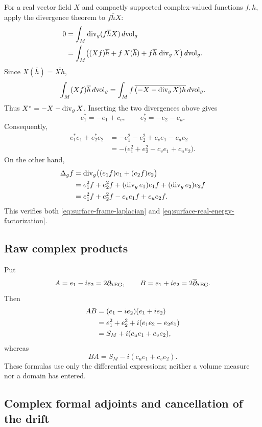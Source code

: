 For a real vector field $X$ and compactly supported complex-valued functions
$f,h$, apply the divergence theorem to $f\overline h X$:
\begin{align*}
 0
 &=\int_M\operatorname{div}_g(f\overline h X)\,d\mathrm{vol}_g\\
 &=\int_M
   \bigl((Xf)\overline h+f\,X(\overline h)
         +f\overline h\,\operatorname{div}_gX\bigr)\,d\mathrm{vol}_g.
\end{align*}
Since $X(\overline h)=\overline{Xh}$,
\begin{equation}\label{eq:appendix-vector-field-adjoint}
 \int_M(Xf)\overline h\,d\mathrm{vol}_g
 =\int_M f\,
  \overline{(-X-\operatorname{div}_gX)h}\,d\mathrm{vol}_g.
\end{equation}
Thus $X^*=-X-\operatorname{div}_gX$.  Inserting the two divergences above gives
\[
 e_1^*=-e_1+c_v,
 \qquad
 e_2^*=-e_2-c_u.
\]
Consequently,
\begin{align*}
 e_1^*e_1+e_2^*e_2
 &=-e_1^2-e_2^2+c_ve_1-c_ue_2\\
 &=-\bigl(e_1^2+e_2^2-c_ve_1+c_ue_2\bigr).
\end{align*}
On the other hand,
\begin{align*}
 \Delta_gf
 &=\operatorname{div}_g\bigl((e_1f)e_1+(e_2f)e_2\bigr)\\
 &=e_1^2f+e_2^2f
   +(\operatorname{div}_ge_1)e_1f+(\operatorname{div}_ge_2)e_2f\\
 &=e_1^2f+e_2^2f-c_ve_1f+c_ue_2f.
\end{align*}
This verifies both
\eqref{eq:surface-frame-laplacian} and
\eqref{eq:surface-real-energy-factorization}.

\subsection{Raw complex products}

Put
\[
 A=e_1-ie_2=2\partial_{\!\mathrm{AEG}},
 \qquad
 B=e_1+ie_2=2\overline\partial_{\!\mathrm{AEG}}.
\]
Then
\begin{align}
 AB
 &=(e_1-ie_2)(e_1+ie_2)\notag\\
 &=e_1^2+e_2^2+i(e_1e_2-e_2e_1)\notag\\
 &=S_M+i(c_ue_1+c_ve_2),
 \label{eq:appendix-raw-product-ab}
\end{align}
whereas
\begin{equation}\label{eq:appendix-raw-product-ba}
 BA=S_M-i(c_ue_1+c_ve_2).
\end{equation}
These formulas use only the differential expressions; neither a volume measure
nor a domain has entered.

\subsection{Complex formal adjoints and cancellation of the drift}

